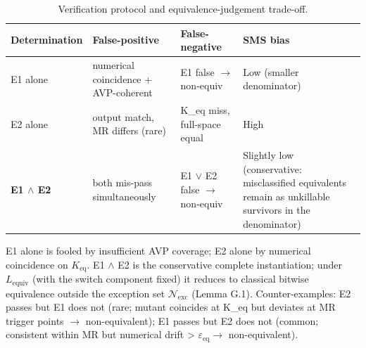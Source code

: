 \documentclass[review,12pt,authoryear]{elsarticle}
\begin{document}
{\def\LTcaptype{table} %
\begin{longtable}[]{@{}
  >{\raggedright\arraybackslash}p{}
  >{\raggedright\arraybackslash}p{}
  >{\raggedright\arraybackslash}p{}
  >{\raggedright\arraybackslash}p{}@{}}
\caption{Verification protocol and equivalence-judgement trade-off.}\label{tab:p2-16}\\
\toprule\noalign{}
\begin{minipage}[b]{\linewidth}\raggedright
Determination
\end{minipage} & \begin{minipage}[b]{\linewidth}\raggedright
False-positive
\end{minipage} & \begin{minipage}[b]{\linewidth}\raggedright
False-negative
\end{minipage} & \begin{minipage}[b]{\linewidth}\raggedright
SMS bias
\end{minipage} \\
\midrule\noalign{}
\endfirsthead
\endhead
\bottomrule\noalign{}
\endlastfoot
E1 alone & numerical coincidence + AVP-coherent & E1 false $\to$ non-equiv &
Low (smaller denominator) \\
E2 alone & output match, MR differs (rare) & K\_eq miss, full-space
equal & High \\
\textbf{E1 $\wedge$ E2} & both mis-pass simultaneously & E1 $\vee$ E2 false $\to$ non-equiv
& Slightly low (conservative: misclassified equivalents remain as
unkillable survivors in the denominator) \\
\end{longtable}
}

E1 alone is fooled by insufficient AVP coverage; E2 alone by numerical
coincidence on $K_{\mathrm{eq}}$. E1 $\wedge$ E2 is the conservative complete
instantiation; under $L_{\mathrm{equiv}}$ (with the switch component
fixed) it reduces to
classical bitwise equivalence outside the exception set
$\mathcal{N}_{\mathrm{exc}}$ (Lemma G.1). Counter-examples: E2 passes
but E1 does not (rare; mutant coincides at K\_eq but deviates at MR
trigger points $\to$ non-equivalent); E1 passes but E2 does not (common;
consistent within MR but numerical drift \textgreater{} $\varepsilon_{\mathrm{eq}} \to$
non-equivalent).

\end{document}
